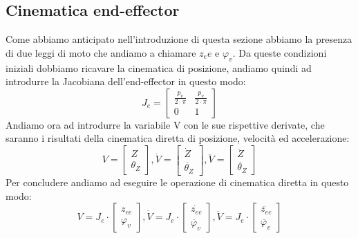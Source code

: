 \subsection{Cinematica end-effector}
Come abbiamo anticipato nell'introduzione di questa sezione abbiamo la presenza di due leggi di moto che andiamo a chiamare $z_ee$ e $\varphi_v$. Da queste condizioni iniziali dobbiamo ricavare la cinematica di posizione, andiamo quindi ad introdurre la Jacobiana dell'end-effector in questo modo: 
\begin{equation*}
J_e =
    \begin{bmatrix}
    \frac{p_v}{2\cdot \pi} & \frac{p_v}{2\cdot \pi} \\
    0 & 1
    \end{bmatrix}
\end{equation*}
Andiamo ora ad introdurre la variabile V con le sue rispettive derivate, che saranno i risultati della cinematica diretta di posizione, velocità ed accelerazione:
\begin{equation*}
    V = 
    \begin{bmatrix}
     Z \\ 
     \theta_Z
    \end{bmatrix}, 
    \dot{V} = 
    \begin{bmatrix}
    \dot{Z} \\ \dot{\theta_Z}
    \end{bmatrix},
    \ddot{V} =
    \begin{bmatrix}
    \ddot{Z} \\ \ddot{\theta_Z}
    \end{bmatrix}
\end{equation*}
Per concludere andiamo ad eseguire le operazione di cinematica diretta in questo modo:
\begin{equation}
    V = J_e\cdot \begin{bmatrix}
    z_{ee} \\ \varphi_v
    \end{bmatrix},
    \dot{V} = J_e\cdot \begin{bmatrix}
    \dot{z_{ee}} \\ \dot{\varphi_v}
    \end{bmatrix},
    \ddot{V} = J_e\cdot \begin{bmatrix}
    \ddot{z_{ee}} \\ \ddot{\varphi_v}
    \end{bmatrix}
\end{equation}

